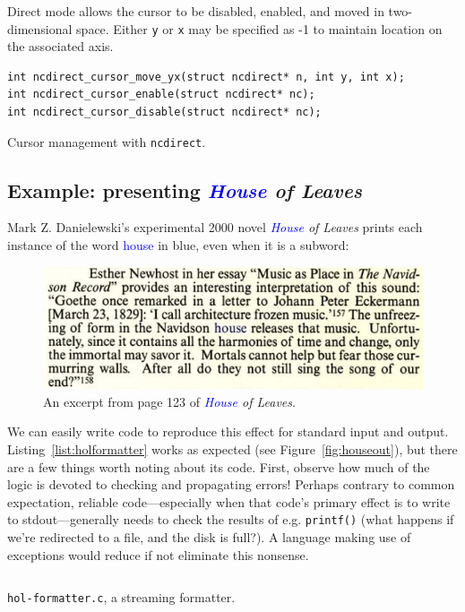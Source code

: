 \documentclass[letterpaper,10pt]{article}
\begin{document}
Direct mode allows the cursor to be disabled, enabled, and moved in
two-dimensional space. Either \texttt{y} or \texttt{x} may be specified as -1
to maintain location on the associated axis.

\begin{listing}[!htb]
\begin{verbatim}
int ncdirect_cursor_move_yx(struct ncdirect* n, int y, int x);
int ncdirect_cursor_enable(struct ncdirect* nc);
int ncdirect_cursor_disable(struct ncdirect* nc);
\end{verbatim}
\caption{Cursor management with \texttt{ncdirect}.}
\end{listing}

\subsection{Example: presenting \textit{\textcolor{blue}{House} of Leaves}}
Mark Z. Danielewski's experimental 2000 novel \textit{\textcolor{blue}{House} of Leaves}\cite{danielewski2000house} prints each
instance of the word \textcolor{blue}{house} in blue, even when it is a subword:

\begin{figure}[!htb]
\centering \includegraphics[width=.5\linewidth]{house-blue.png}
\caption[]{An excerpt from page 123 of \textit{\textcolor{blue}{House} of Leaves}.}
\label{fig:houseofleaves}
\end{figure}

We can easily write code to reproduce this effect for standard input and output.
Listing~\ref{list:holformatter} works as expected (see
Figure~\ref{fig:houseout}), but there are a few things worth noting about its
code. First, observe how much of the logic is devoted to checking and
propagating errors! Perhaps contrary to common expectation, reliable
code---especially when that code's primary effect is to write to
stdout---generally needs to check the results of e.g. \texttt{printf()} (what
happens if we're redirected to a file, and the disk is full?). A language
making use of exceptions would reduce if not eliminate this nonsense.

\begin{listing}[!htb]
\inputminted[]{C}{code/hol-formatter.c}
\caption{\texttt{hol-formatter.c}, a streaming formatter.}
\label{list:holformatter}
\end{listing}
\end{document}
